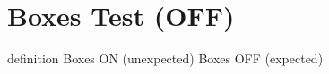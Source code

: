 \documentclass{article}
\begin{document}
\section*{Boxes Test (OFF)}

\ifcsname definition\endcsname
Boxes ON (unexpected)
\else
Boxes OFF (expected)
\fi
\end{document}
